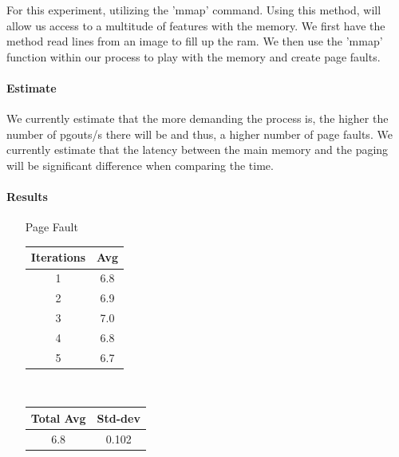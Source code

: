 For this experiment, utilizing the 'mmap' command. Using this method, will allow us access to a multitude of features with the memory. We first have the method read lines from an image to fill up the ram. We then use the 'mmap' function within our process to play with the memory and create page faults.

\paragraph{Estimate}

We currently estimate that the more demanding the process is, the higher the number of pgouts/s there will be and thus, a higher number of page faults. We currently estimate that the latency between the main memory and the paging will be significant difference when comparing the time.  

\paragraph{Results}

\begin{enumerate}
    \item [Page Fault]
        \begin{center}
            \begin{tabular}{||c c||} 
             \hline
             Iterations & Avg \\ [0.5ex] 
             \hline\hline
             1 & 6.8  \\ 
             \hline
             2 & 6.9  \\ 
             \hline
             3 & 7.0  \\ 
             \hline
             4 & 6.8 \\ 
             \hline
             5 & 6.7  \\ 
             \hline
             \hline
            \end{tabular} \\

                \begin{tabular}{||c c||} 
                 \hline
                 Total Avg & Std-dev \\ [0.5ex] 
                 \hline\hline
                 6.8 & 0.102\\ 
                 \hline
                \hline
            \end{tabular}
            \end{center}
        \end{enumerate}

